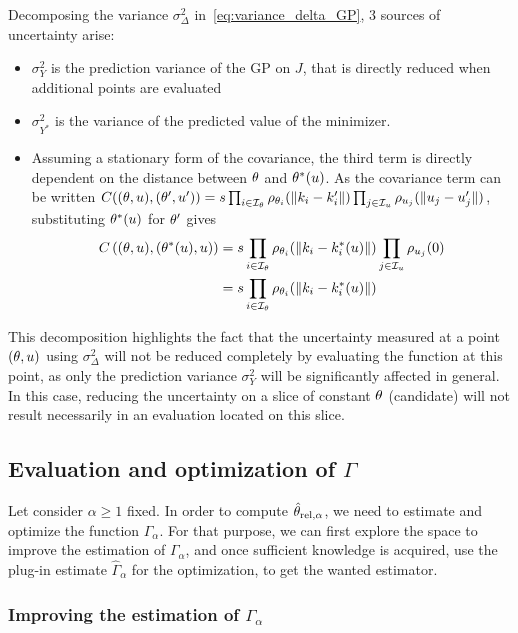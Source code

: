 \documentclass[../../Main_ManuscritThese.tex]{subfiles}
\begin{document}
Decomposing the variance $\sigma^2_{\Delta}$ in~\cref{eq:variance_delta_GP}, 3 sources of uncertainty arise:
\begin{itemize}
\item $\sigma^2_{Y}$ is the prediction variance of the GP on $J$, that is directly reduced when additional points are evaluated
\item $\sigma^2_{Y^*}$ is the variance of the predicted value of the minimizer.
\item Assuming a stationary form of the covariance, the third term is directly dependent on the distance between $\theta$ and $\theta^*(u)$. As the covariance term can be written $C((\theta,u), (\theta',u')) = s \prod_{i\in\mathcal{I}_{\theta}}\rho_{\theta_i}(\|k_i - k'_i\|) \prod_{j\in\mathcal{I}_{u}} \rho_{u_j}(\|u_j - u'_j\|)$, substituting $\theta^*(u)$ for $\theta^\prime$ gives
\begin{align}
  C\left((\theta,u),(\theta^*(u),u)\right) &= s \prod_{i\in\mathcal{I}_{\theta}}\rho_{\theta_i}(\|k_i - k^*_i(u)\|)\prod_{j\in\mathcal{I}_{u}} \rho_{u_j}(0) \\
  &=s \prod_{i\in\mathcal{I}_{\theta}}\rho_{\theta_i}(\|k_i - k^*_i(u)\|)
\end{align}
\end{itemize}
This decomposition highlights the fact that the uncertainty measured at a point $(\theta, u)$ using $\sigma_{\Delta}^2$ will not be reduced completely by evaluating the function at this point, as only the prediction variance $\sigma_Y^2$ will be significantly affected in general. In this case, reducing the uncertainty on a slice of constant $\theta$ (candidate) will not result necessarily in an evaluation located on this slice.


\subsection{Evaluation and optimization of $\Gamma$}
Let consider $\alpha\geq 1$ fixed. In order to compute $\hat{\theta}_{\mathrm{rel, \alpha}}$, we need to estimate and optimize the function $\Gamma_{\alpha}$. For that purpose, we can first explore the space to improve the estimation of $\Gamma_{\alpha}$, and once sufficient knowledge is acquired, use the plug-in estimate $\hat{\Gamma}_{\alpha}$ for the optimization, to get the wanted estimator.
\subsubsection{Improving the estimation of $\Gamma_{\alpha}$}
\end{document}
